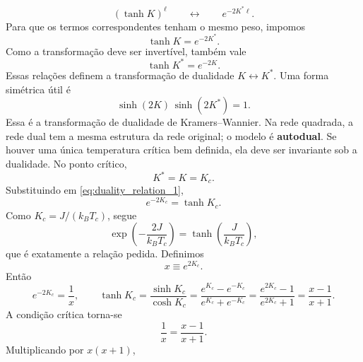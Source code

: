 \documentclass[11pt,a4paper]{article}
\begin{document}
%
\begin{equation}
    (\tanh K)^{\ell}
    \qquad\longleftrightarrow\qquad
    e^{-2K^*\ell}.
\end{equation}
%
Para que os termos correspondentes tenham o mesmo peso, impomos
%
\begin{equation}
    \tanh K=e^{-2K^*}.
    \label{eq:duality_relation_1}
\end{equation}
%
Como a transformação deve ser invertível, também vale
%
\begin{equation}
    \tanh K^*=e^{-2K}.
    \label{eq:duality_relation_2}
\end{equation}
%
Essas relações definem a transformação de dualidade \(K\leftrightarrow K^*\). Uma forma simétrica útil é
%
\begin{equation}
    \sinh(2K)\,\sinh(2K^*)=1.
    \label{eq:sinh_duality}
\end{equation}
%
Essa é a transformação de dualidade de Kramers--Wannier. Na rede quadrada, a rede dual tem a mesma estrutura da rede original; o
modelo é \textbf{autodual}. Se houver uma única temperatura crítica bem definida, ela deve ser invariante sob a dualidade. No ponto crítico,
%
\begin{equation}
    K^*=K=K_c.
    \label{eq:self_dual_condition}
\end{equation}
%
Substituindo em \eqref{eq:duality_relation_1},
%
\begin{equation}
    e^{-2K_c}=\tanh K_c.
    \label{eq:critical_duality}
\end{equation}
%
Como \(K_c=J/(k_BT_c)\), segue
%
\begin{equation}
    \boxed{
    \exp\left(
        -\frac{2J}{k_BT_c}
    \right)
    =
    \tanh\left(
        \frac{J}{k_BT_c}
    \right),
    }
    \label{eq:Tc_equation}
\end{equation}
%
que é exatamente a relação pedida. Definimos
%
\begin{equation}
    x\equiv e^{2K_c}.
\end{equation}
%
Então
%
\begin{equation}
    e^{-2K_c}=\frac1x,
    \qquad
    \tanh K_c
    =
    \frac{\sinh K_c}{\cosh K_c}
    =
    \frac{e^{K_c}-e^{-K_c}}{e^{K_c}+e^{-K_c}}
    =
    \frac{e^{2K_c}-1}{e^{2K_c}+1}
    =
    \frac{x-1}{x+1}.
\end{equation}
%
A condição crítica torna-se
%
\begin{equation}
    \frac1x
    =
    \frac{x-1}{x+1}.
\end{equation}
%
Multiplicando por \(x(x+1)\),
\end{document}
